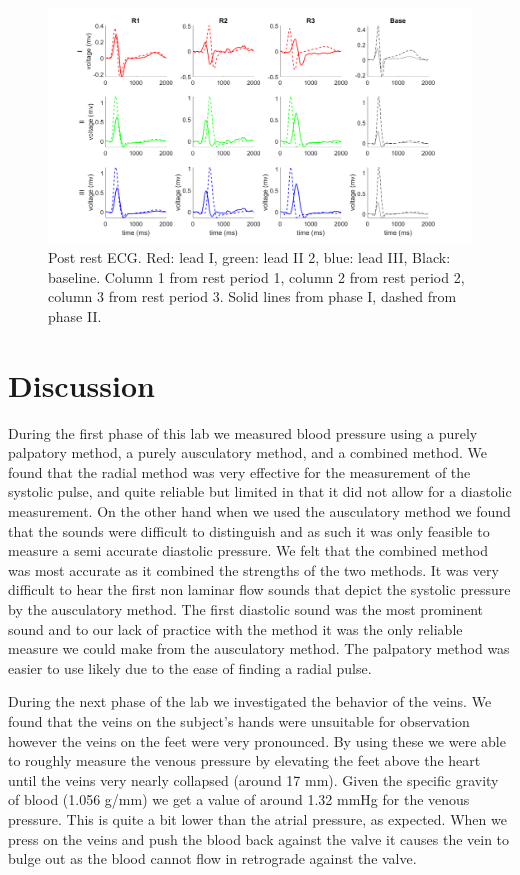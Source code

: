 \documentclass[12pt]{article}
\begin{document}
\begin{figure}[H]
	
	\centering
	\includegraphics[width = .8\textwidth]{Figures/postrest.png}
	\caption{Post rest ECG. Red: lead I, green: lead II 2, blue: lead III, Black: baseline. Column 1 from rest period 1, column 2 from rest period 2, column 3 from rest period 3. Solid lines from phase I, dashed from phase II.}
	\label{reco}
\end{figure}


\section{Discussion}

During the first phase of this lab we measured blood pressure using a purely palpatory method, a purely ausculatory method, and a combined method. We found that the radial method was very effective for the measurement of the systolic pulse, and quite reliable but limited in that it did not allow for a diastolic measurement. On the other hand when we used the ausculatory method we found that the sounds were difficult to distinguish and as such it was only feasible to measure a semi accurate diastolic pressure. We felt that the combined method was most accurate as it combined the strengths of the two methods. It was very difficult to hear the first non laminar flow sounds that depict the systolic pressure by the ausculatory method. The first diastolic sound was the most prominent sound and to our lack of practice with the method it was the only reliable measure we could make from the ausculatory method. The palpatory method was easier to use likely due to the ease of finding a radial pulse.

During the next phase of the lab we investigated the behavior of the veins. We found that the veins on the subject's hands were unsuitable for observation however the veins on the feet were very pronounced. By using these we were able to roughly measure the venous pressure by elevating the feet above the heart until the veins very nearly collapsed (around 17 mm). Given the specific gravity of blood (1.056 g/mm) we get a value of around 1.32 mmHg for the venous pressure. This is quite a bit lower than the atrial pressure, as expected. When we press on the veins and push the blood back against the valve it causes the vein to bulge out as the blood cannot flow in retrograde against the valve.
\end{document}
